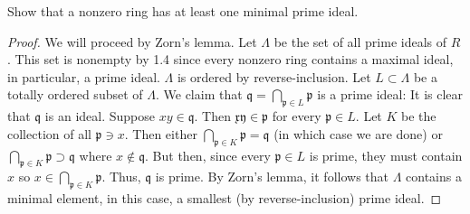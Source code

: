 \newpage
\begin{problem}
Show that a nonzero ring has at least one minimal prime ideal.
\end{problem}
\begin{proof}
We will proceed by Zorn's lemma. Let $\Lambda$ be the set of all
prime ideals of $R$. This set is nonempty by 1.4 since every
nonzero ring contains a maximal ideal, in particular, a prime
ideal. $\Lambda$ is ordered by reverse-inclusion. Let
$L\subset\Lambda$ be a totally ordered subset of $\Lambda$. We
claim that $\mathfrak{q}=\bigcap_{\mathfrak{p}\in L}\mathfrak{p}$
is a prime ideal: It is clear that $\mathfrak{q}$ is an
ideal. Suppose $xy\in\mathfrak{q}$. Then
$\mathfrak{xy}\in\mathfrak{p}$ for every $\mathfrak{p}\in L$. Let
$K$ be the collection of all $\mathfrak{p}\ni x$. Then either
$\bigcap_{\mathfrak{p}\in K}\mathfrak{p}=\mathfrak{q}$ (in which
case we are done) or $\bigcap_{\mathfrak{p}\in
  K}\mathfrak{p}\supset\mathfrak{q}$ where
$x\notin\mathfrak{q}$. But then, since every $\mathfrak{p}\in L$
is prime, they must contain $x$ so $x\in\bigcap_{\mathfrak{p}\in
  K}\mathfrak{p}$. Thus, $\mathfrak{q}$ is prime. By Zorn's
lemma, it follows that $\Lambda$ contains a minimal element, in
this case, a smallest (by reverse-inclusion) prime ideal.
\end{proof}


